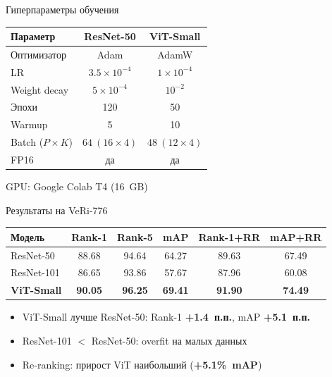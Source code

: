 \documentclass[aspectratio=169,12pt]{beamer}
\begin{document}
\begin{frame}{Гиперпараметры обучения}
  \begin{center}
  \renewcommand{\arraystretch}{1.4}
  \begin{tabular}{lcc}
    \toprule
    \textbf{Параметр} & \textbf{ResNet-50} & \textbf{ViT-Small} \\
    \midrule
    Оптимизатор & Adam & AdamW \\
    LR & $3.5\!\times\!10^{-4}$ & $1\!\times\!10^{-4}$ \\
    Weight decay & $5\!\times\!10^{-4}$ & $10^{-2}$ \\
    Эпохи & 120 & 50 \\
    Warmup & 5 & 10 \\
    Batch ($P\!\times\!K$) & $64\ (16\!\times\!4)$ & $48\ (12\!\times\!4)$ \\
    FP16 & да & да \\
    \bottomrule
  \end{tabular}
  \end{center}
  \vspace{0.4em}
  {\centering\small GPU: Google Colab T4 (16~GB)\par}
\end{frame}

\begin{frame}{Результаты на VeRi-776}
  \begin{center}
  \renewcommand{\arraystretch}{1.4}
  \begin{tabular}{lccccc}
    \toprule
    \textbf{Модель} & \textbf{Rank-1} & \textbf{Rank-5} & \textbf{mAP}
                    & \textbf{Rank-1+RR} & \textbf{mAP+RR} \\
    \midrule
    ResNet-50  & 88.68 & 94.64 & 64.27 & 89.63 & 67.49 \\
    \rowcolor{rowgray}
    ResNet-101 & 86.65 & 93.86 & 57.67 & 87.96 & 60.08 \\
    \rowcolor{rowhl}
    \textbf{ViT-Small}
      & \textbf{90.05} & \textbf{96.25} & \textbf{69.41}
      & \textbf{91.90} & \textbf{74.49} \\
    \bottomrule
  \end{tabular}
  \end{center}
  \vspace{0.5em}
  \begin{itemize}
    \item ViT-Small лучше ResNet-50: Rank-1 \textbf{+1.4~п.п.}, mAP \textbf{+5.1~п.п.}
    \item ResNet-101 $<$ ResNet-50: overfit на малых данных
    \item Re-ranking: прирост ViT наибольший (\textbf{+5.1\%~mAP})
  \end{itemize}
\end{frame}
\end{document}
